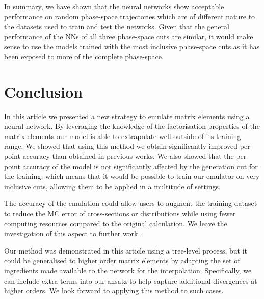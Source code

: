 \documentclass[main.tex]{subfiles}
\begin{document}
In summary, we have shown that the neural networks show acceptable performance on random phase-space trajectories which are of different nature to the datasets used to train and test the networks.
Given that the general performance of the NNs of all three phase-space cuts are similar, it would make sense to use the models trained with the most inclusive phase-space cuts as it has been exposed
to more of the complete phase-space.

\section{Conclusion}\label{sec:conclusion}
In this article we presented a new strategy to emulate matrix elements using a neural network. By leveraging the knowledge of 
the factorisation properties of the matrix elements our model is able to extrapolate well outside of its training range. 
We showed that using this method we obtain significantly improved per-point accuracy than obtained in previous works. 
We also showed that the per-point accuracy of the model is not significantly affected by the generation cut for the training, which means that
it would be possible to train our emulator on very inclusive cuts, allowing them to be applied in a multitude of settings. 

The accuracy of the emulation could allow users to augment the training dataset to reduce the MC error of cross-sections or distributions while using 
fewer computing resources compared to the original calculation. We leave the investigation of this aspect to further work.

Our method was demonstrated in this article using a tree-level process, but it could be generalised to higher order matrix elements by adapting the set 
of ingredients made available to the network for the interpolation. Specifically, we can include extra terms into our ansatz to help capture additional divergences at higher orders. We look forward to applying this method to such cases.
\end{document}
